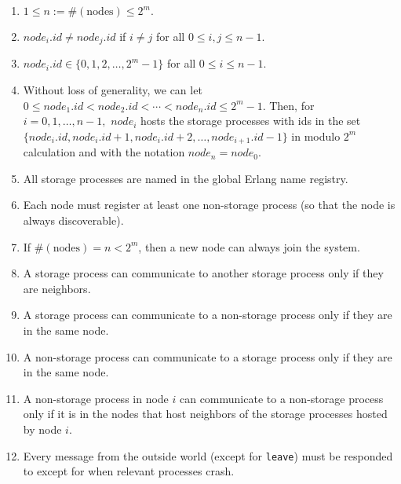 \documentclass[11pt]{article}
\begin{document}
\begin{enumerate}[S1]
\item $1 \leq n:= \#(\text{nodes}) \leq 2^m.$

\item $node_i.id \neq node_j.id$ if $i\neq j$ for all $0\leq i,j \leq n - 1.$ 

\item $node_i.id \in \{0,1,2,\ldots, 2^m - 1\}$ for all $0\leq i \leq n - 1.$ 

\item Without loss of generality, we can let
$0 \leq node_1.id < node_2.id < \cdots < node_n.id \leq 2^m - 1.$
Then, for $i= 0, 1, \ldots, n - 1,$ $node_i$ hosts the storage processes with ids in the set $\{node_i.id, node_i.id + 1, node_i.id + 2, \ldots, node_{i+1}.id - 1\}$ in modulo $2^m$ calculation and with the notation $node_{n} = node_0.$

\item All storage processes are named in the global Erlang name registry.

\item Each node must register at least one non-storage process (so that the node is always discoverable).


\item If $\#(\text{nodes}) = n < 2^m$, then a new node can always join the system.

\item A storage process can communicate to another storage process only if they are neighbors.

\item  A storage process can communicate to a non-storage process only if they are in the same node.

\item A non-storage process can communicate to a storage process only if they are in the same node.

\item  A non-storage process in node $i$ can communicate to a non-storage process only if it is in the nodes that host neighbors of the storage processes hosted by node $i$.

\item Every message from the outside world (except for \texttt{leave}) must be responded to except for when relevant processes crash.
\end{enumerate}
\end{document}
